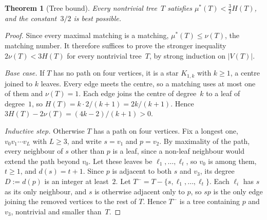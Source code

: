 \documentclass[10pt,a4paper]{amsart}
\newtheorem{theorem}{Theorem}
\newcommand{\mustar}{\mu^{*}}
\begin{document}
\begin{theorem}[Tree bound]\label{thm:treebound}
Every nontrivial tree~$T$ satisfies $\mustar(T) < \tfrac{3}{2} H(T)$, and the
constant~$3/2$ is best possible.
\end{theorem}

\begin{proof}
Since every maximal matching is a matching, $\mustar(T) \le \nu(T)$, the
matching number.  It therefore suffices to prove the stronger inequality
$2\nu(T) < 3H(T)$ for every nontrivial tree~$T$, by strong
induction on $|V(T)|$.

\emph{Base case.}  If $T$ has no path on four vertices, it is a star
$K_{1,k}$ with $k \ge 1$, a centre joined to $k$ leaves.  Every edge meets
the centre, so a matching uses at most one of them and $\nu(T) = 1$.  Each
edge joins the centre of degree~$k$ to a leaf of degree~$1$, so
$H(T) = k \cdot 2/(k+1) = 2k/(k+1)$.  Hence
$3H(T) - 2\nu(T) = (4k-2)/(k+1) > 0$.

\emph{Inductive step.}  Otherwise $T$ has a path on four vertices.
Fix a longest one, $v_0 v_1 \cdots v_L$ with $L \ge 3$, and write $s = v_1$
and $p = v_2$.  By
maximality of the path, every neighbour of $s$ other than $p$ is a leaf,
since a non-leaf neighbour would extend the path beyond $v_0$.  Let
these leaves be $\ell_1, \ldots, \ell_t$, so $v_0$ is among them, $t \ge 1$, and
$d(s) = t+1$.  Since $p$ is adjacent to both $s$ and $v_3$, its degree
$D := d(p)$ is an integer at least~$2$.  Let
$T^- = T - \{s, \ell_1, \ldots, \ell_t\}$.
Each $\ell_i$ has $s$ as its only neighbour, and $s$ is otherwise adjacent
only to $p$, so $sp$ is the only edge joining the removed vertices to the
rest of $T$.  Hence $T^-$ is a tree containing $p$ and $v_3$, nontrivial and
smaller than~$T$.


\end{proof}
\end{document}
